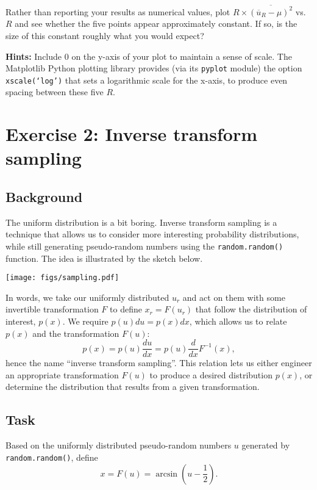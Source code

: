 \documentclass[12 pt]{article} %
\newcommand{\ubar}{\ensuremath{\overline u} }
\newcommand{\showmarks}[1]{\rightline{\texttt{[#1 marks]}}} %
\begin{document}
Rather than reporting your results as numerical values, plot $R \times \overline{\left(\ubar_R - \mu\right)^2}$ vs.\ $R$ and see whether the five points appear approximately constant.
If so, is the size of this constant roughly what you would expect?

\textbf{Hints:} Include $0$ on the y-axis of your plot to maintain a sense of scale.
The Matplotlib Python plotting library provides (via its \texttt{pyplot} module) the option \texttt{xscale(`log')} that sets a logarithmic scale for the x-axis, to produce even spacing between these five $R$.

\showmarks{8}



\section*{Exercise 2: Inverse transform sampling}
\subsection*{Background}
The uniform distribution is a bit boring.
Inverse transform sampling is a technique that allows us to consider more interesting probability distributions, while still generating pseudo-random numbers using the \texttt{random.random()} function.
The idea is illustrated by the sketch below.
\begin{center}
  \texttt{[image: figs/sampling.pdf]}
\end{center}

In words, we take our uniformly distributed $u_r$ and act on them with some invertible transformation $F$ to define $x_r = F(u_r)$ that follow the distribution of interest, $p(x)$.
We require $p(u) du = p(x) dx$, which allows us to relate $p(x)$ and the transformation $F(u)$:
\begin{equation*}
  p(x) = p(u) \frac{du}{dx} = p(u) \frac{d}{dx} F^{-1}(x),
\end{equation*}
hence the name ``inverse transform sampling''.
This relation lets us either engineer an appropriate transformation $F(u)$ to produce a desired distribution $p(x)$, or determine the distribution that results from a given transformation.

\subsection*{Task}
Based on the uniformly distributed pseudo-random numbers $u$ generated by \texttt{random.random()}, define
\begin{equation}
  \label{eq:transform}
  x = F(u) = \arcsin\left(u - \frac{1}{2}\right).
\end{equation}
\end{document}
